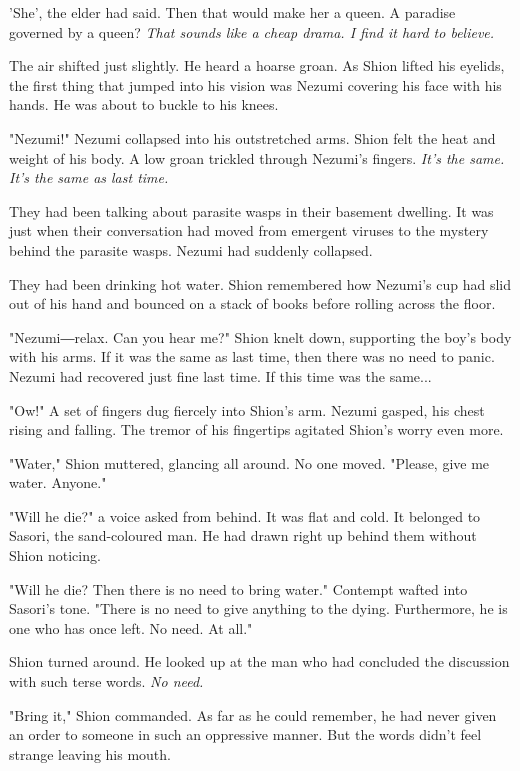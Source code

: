 'She', the elder had said. Then that would make her a queen. A paradise
governed by a queen? \emph{That sounds like a cheap drama. I find it hard to
believe.}

The air shifted just slightly. He heard a hoarse groan. As Shion lifted
his eyelids, the first thing that jumped into his vision was Nezumi
covering his face with his hands. He was about to buckle to his knees.

\mybreak

"Nezumi!" Nezumi collapsed into his outstretched arms. Shion felt the
heat and weight of his body. A low groan trickled through Nezumi's
fingers. \emph{It's the same. It's the same as last time.}

They had been talking about parasite wasps in their basement dwelling.
It was just when their conversation had moved from emergent viruses to
the mystery behind the parasite wasps. Nezumi had suddenly collapsed.

They had been drinking hot water. Shion remembered how Nezumi's cup had
slid out of his hand and bounced on a stack of books before rolling
across the floor.

"Nezumi―relax. Can you hear me?" Shion knelt down, supporting the boy's
body with his arms. If it was the same as last time, then there was no
need to panic. Nezumi had recovered just fine last time. If this time
was the same...~

"Ow!" A set of fingers dug fiercely into Shion's arm. Nezumi gasped, his
chest rising and falling. The tremor of his fingertips agitated Shion's
worry even more.

"Water," Shion muttered, glancing all around. No one moved. "Please,
give me water. Anyone."

"Will he die?" a voice asked from behind. It was flat and cold. It
belonged to Sasori, the sand-coloured man. He had drawn right up behind
them without Shion noticing.

"Will he die? Then there is no need to bring water." Contempt wafted
into Sasori's tone. "There is no need to give anything to the dying.
Furthermore, he is one who has once left. No need. At all."

Shion turned around. He looked up at the man who had concluded the
discussion with such terse words. \emph{No need.}

"Bring it," Shion commanded. As far as he could remember, he had never
given an order to someone in such an oppressive manner. But the words
didn't feel strange leaving his mouth.

